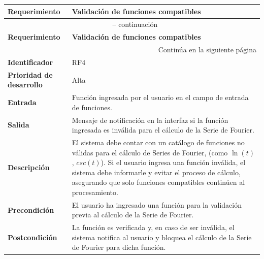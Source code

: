 \begin{longtable}{|m{3.5cm}|m{9.5cm}|}
	\hline
	\rowcolor{black!75} \color{white}\textbf{Requerimiento} & \color{white}\textbf{Validación de funciones compatibles} \\
	\hline
	\endfirsthead
	\multicolumn{2}{c}{{\tablename\ \thetable{} -- continuación}} \\
	\hline
	\rowcolor{black!75} \color{white}\textbf{Requerimiento} & \color{white}\textbf{Validación de funciones compatibles} \\
	\hline
	\endhead
	\hline \multicolumn{2}{r}{{Continúa en la siguiente página}} \\
	\endfoot
	\hline
	\endlastfoot
	
	\textbf{Identificador} & RF4 \\
	\hline
	\textbf{Prioridad de desarrollo} & Alta \\
	\hline
	\textbf{Entrada} & Función ingresada por el usuario en el campo de entrada de funciones. \\
	\hline
	\textbf{Salida} & Mensaje de notificación en la interfaz si la función ingresada es inválida para el cálculo de la Serie de Fourier. \\
	\hline
	\textbf{Descripción} & El sistema debe contar con un catálogo de funciones no válidas para el cálculo de Series de Fourier, (como \( \ln(t) \), $csc(t)$). Si el usuario ingresa una función inválida, el sistema debe informarle y evitar el proceso de cálculo, asegurando que solo funciones compatibles continúen al procesamiento. \\
	\hline
	\textbf{Precondición} & El usuario ha ingresado una función para la validación previa al cálculo de la Serie de Fourier. \\
	\hline
	\textbf{Postcondición} & La función es verificada y, en caso de ser inválida, el sistema notifica al usuario y bloquea el cálculo de la Serie de Fourier para dicha función. \\
	\hline
\end{longtable}
\caption{Requerimiento funcional No. 4} \label{tabla:RF4}
\vspace{0.5cm}


